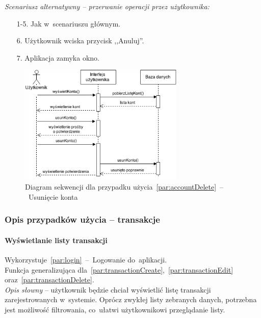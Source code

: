 \noindent \textit{Scenariusz alternatywny -- przerwanie operacji przez użytkownika:}
\begin{enumerate}
  \item[1-5.] Jak w~scenariuszu głównym.
  \item[6.] Użytkownik wciska przycisk ,,Anuluj''.
  \item[7.] Aplikacja zamyka okno.
\end{enumerate}

\begin{figure}[H]
  \centering
  \includegraphics[width=0.7\textwidth]{images/sequence-diagram-account-delete.png}
  \caption{Diagram sekwencji dla przypadku użycia~\ref{par:accountDelete}~--~Usunięcie konta}
\end{figure}

\subsubsection{Opis przypadków użycia -- transakcje}


\paragraph{Wyświetlanie listy transakcji\newline}
\label{par:transactionsView}
Wykorzystuje~\ref{par:login}~--~Logowanie do~aplikacji.\\
\indent Funkcja generalizująca dla~\ref{par:transactionCreate},~\ref{par:transactionEdit} oraz~\ref{par:transactionDelete}.\\

\textit{Opis słowny} -- użytkownik będzie chciał wyświetlić listę transakcji zarejestrowanych w~systemie. Oprócz zwykłej listy zebranych danych, potrzebna jest możliwość filtrowania, co~ułatwi użytkownikowi przeglądanie listy.

